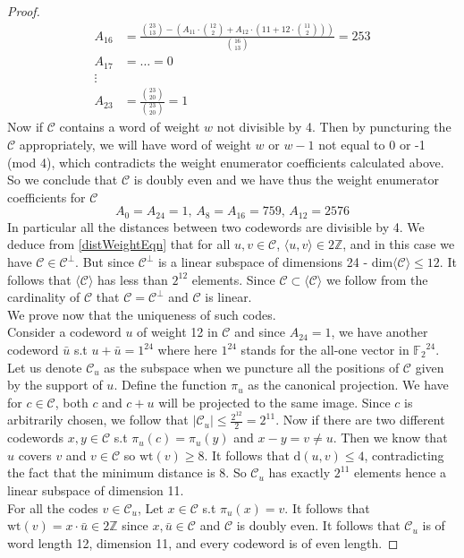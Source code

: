 \documentclass{article}
\numberwithin{equation}{theorem}
\newcommand{\cCodes}{\ensuremath{\mathscr{C}}}
\newcommand{\cCodesVertical}{\cCodes^{\bot}}
\newcommand{\ftwoN}[1]{\ensuremath{\mathbb{F}_2}^{#1}}
\newcommand{\wt}[1]{\ensuremath{\text{wt}(#1)}}
\newcommand{\dist}[2]{\ensuremath{\text{d}(#1,#2)}}
\newcommand{\Integer}{\mathbb{Z}}
\begin{document}
\begin{proof}
\begin{align*}
		A_{16} &= \frac{\binom{23}{13} - (A_{11} \cdot \binom{12}{2} + A_{12}\cdot(11 + 12 \cdot\binom{11}{2}))}{\binom{16}{13}} = 253\\
		A_{17} &= \ldots = 0 \\
		\vdots\\
		A_{23} &= \frac{\binom{23}{20}}{\binom{23}{20}} = 1
	\end{align*}
Now if {\cCodes} contains a word of weight $w$ not divisible by 4. Then by puncturing the {\cCodes} appropriately, we will have word of weight $w$ or $w - 1$ not equal to 0 or -1 (mod 4), which contradicts the weight enumerator coefficients calculated above. So we conclude that {\cCodes} is doubly even and we have thus the weight enumerator coefficients for {\cCodes}
\[
	A_0 = A_{24} = 1, \, A_{8} = A_{16} = 759,\, A_{12} = 2576
\]
In particular all the distances between two codewords are divisible by 4. We deduce from \ref{distWeightEqn} that for all
$u,v \in \cCodes$, $\langle u, v\rangle \in 2\Integer$, and in this case we have $\cCodes \in \cCodesVertical$. But since $\cCodesVertical$ is a linear subspace of dimensions 24 - dim$\langle \cCodes \rangle \leq 12$. It follows that $\langle \cCodes \rangle$ has less than $2^{12}$ elements. Since $\cCodes \subset \langle \cCodes \rangle$ we follow from the cardinality of $\cCodes$ that $\cCodes = \cCodesVertical$ and $\cCodes$ is linear.\\
We prove now that the uniqueness of such codes. \\
Consider a codeword $u$ of weight 12 in {\cCodes} and since $A_{24} = 1$, we have another codeword $\bar{u}$ s.t $u + \bar{u} = 1^{24}$ where here $1^{24}$ stands for the all-one vector in $\ftwoN{24}$. Let us denote $\cCodes_u$ as the subspace when we puncture all the positions of $\cCodes$ given by the support of $u$. Define the function $\pi_{u}$ as the canonical projection.
We have for $c \in \cCodes$, both $c$ and $c + u$ will be projected to the same image. Since $c$ is arbitrarily chosen, we follow that $|\cCodes_u| \leq \frac{2^{12}}{2} = 2^{11}$. Now if there are two different codewords $x,y \in \cCodes$ s.t $\pi_{u}(c) = \pi_{u}(y)$ and $x - y = v \neq u$. Then we know that $u$ covers $v$ and $v \in \cCodes$ so $\wt{v} \geq 8$. It follows that $\dist{u}{v} \leq 4$, contradicting the fact that the minimum distance is 8. So $\cCodes_u$ has exactly $2^{11}$ elements hence a linear subspace of dimension 11.\\
For all the codes $v \in \cCodes_u$, Let $x \in \cCodes$ s.t $\pi_u(x) = v$. It follows that $\wt{v} = x \cdot \bar{u} \in 2\Integer$ since $x, \bar{u} \in \cCodes$ and $\cCodes$ is doubly even. It follows that $\cCodes_u$ is of word length 12, dimension 11, and every codeword is of even length.

\end{proof}
\end{document}
